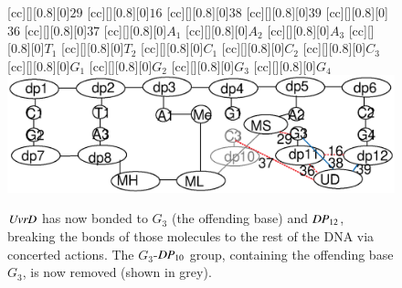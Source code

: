 \begin{figure}[t!]
[cc][][0.8][0]{$29$}
[cc][][0.8][0]{$16$}
[cc][][0.8][0]{$38$}
[cc][][0.8][0]{$39$}
[cc][][0.8][0]{$36$}
[cc][][0.8][0]{$37$}
[cc][][0.8][0]{${A_1}$}
[cc][][0.8][0]{${A_2}$}
[cc][][0.8][0]{${A_3}$}
[cc][][0.8][0]{${T_1}$}
[cc][][0.8][0]{${T_2}$}
[cc][][0.8][0]{${C_1}$}
[cc][][0.8][0]{${C_2}$}
[cc][][0.8][0]{\color{gray}${C_3}$}
[cc][][0.8][0]{${G_1}$}
[cc][][0.8][0]{${G_2}$}
[cc][][0.8][0]{${G_3}$}
[cc][][0.8][0]{${G_4}$}
  \centering
    \includegraphics[width=1.0\textwidth]{mmr/state6}
  \caption[A six base pair DNA fragment.]{%
$\mathit{UvrD}$ has now bonded to $G_3$ (the offending base) and $\mathit{DP}_{12}$, breaking the bonds of those molecules to the rest of the DNA via concerted actions. The $G_3$-$\mathit{DP}_{10}$ group, containing the offending base $G_3$,  is now removed (shown in grey).}
  \label{fig:state6}
\end{figure}

